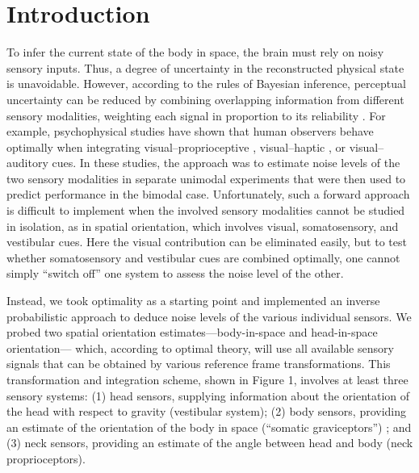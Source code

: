 \section{Introduction}

To infer the current state of the body in space, the brain must rely on noisy sensory inputs. Thus, a degree of uncertainty in the reconstructed physical state is unavoidable. However, according to the rules of Bayesian inference, perceptual uncertainty can be reduced by combining overlapping information from different sensory modalities, weighting each signal in proportion to its reliability \cite{knill2004,kording2004,angelaki2008}. For example, psychophysical studies have shown that human observers behave optimally when integrating visual--proprioceptive \cite{vanbeers1999}, visual--haptic \cite{ernst2002}, or visual--auditory \cite{alais2004} cues. In these studies, the approach was to estimate noise levels of the two sensory modalities in separate unimodal experiments that were then used to predict performance in the bimodal case. Unfortunately, such a forward approach is difficult to implement when the involved sensory modalities cannot be studied in isolation, as in spatial orientation, which involves visual, somatosensory, and vestibular cues. Here the visual contribution can be eliminated easily, but to test whether somatosensory and vestibular cues are combined optimally, one cannot simply ``switch off'' one system to assess the noise level of the other. 

Instead, we took optimality as a starting point and implemented an inverse probabilistic approach to deduce noise levels of the various individual sensors. We probed two spatial orientation estimates---body-in-space and head-in-space orientation--- which, according to optimal theory, will use all available sensory signals that can be obtained by various reference frame transformations. This transformation and integration scheme, shown in Figure 1, involves at least three sensory systems: (1) head sensors, supplying information about the orientation of the head with respect to gravity (vestibular system); (2) body sensors, providing an estimate of the orientation of the body in space (``somatic graviceptors'') \cite{mittelstaedt1997}; and (3) neck sensors, providing an estimate of the angle between head and body (neck proprioceptors). 

